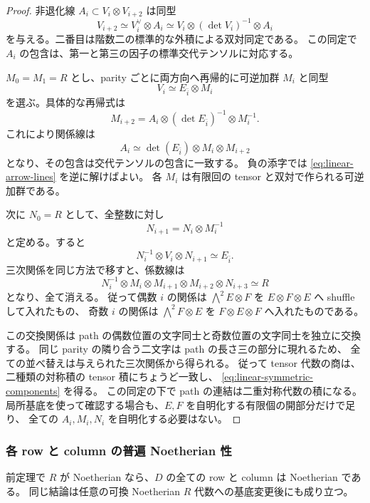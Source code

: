 \begin{proof}
非退化線 $A_i\subset V_i\otimes V_{i+2}$ は同型
\[
 V_{i+2}\simeq V_i^\vee\otimes A_i
 \simeq V_i\otimes(\det V_i)^{-1}\otimes A_i
\]
を与える。二番目は階数二の標準的な外積による双対同定である。
この同定で $A_i$ の包含は、第一と第三の因子の標準交代テンソルに対応する。

$M_0=M_1=R$ とし、parity ごとに両方向へ再帰的に可逆加群 $M_i$ と同型
\[
 V_i\simeq E_{\bar i}\otimes M_i
\]
を選ぶ。具体的な再帰式は
\begin{equation}\label{eq:linear-arrow-lines}
 M_{i+2}=A_i\otimes(\det E_{\bar i})^{-1}\otimes M_i^{-1}.
\end{equation}
これにより関係線は
\[
 A_i\simeq\det(E_{\bar i})\otimes M_i\otimes M_{i+2}
\]
となり、その包含は交代テンソルの包含に一致する。
負の添字では \eqref{eq:linear-arrow-lines} を逆に解けばよい。
各 $M_i$ は有限回の tensor と双対で作られる可逆加群である。

次に $N_0=R$ として、全整数に対し
\begin{equation}\label{eq:linear-vertex-lines}
 N_{i+1}=N_i\otimes M_i^{-1}
\end{equation}
と定める。すると
\[
 N_i^{-1}\otimes V_i\otimes N_{i+1}\simeq E_{\bar i}.
\]
三次関係を同じ方法で移すと、係数線は
\[
 N_i^{-1}\otimes M_i\otimes M_{i+1}\otimes M_{i+2}\otimes N_{i+3}
 \simeq R
\]
となり、全て消える。
従って偶数 $i$ の関係は $\bigwedge^2E\otimes F$ を
$E\otimes F\otimes E$ へ shuffle して入れたもの、
奇数 $i$ の関係は $\bigwedge^2F\otimes E$ を
$F\otimes E\otimes F$ へ入れたものである。

この交換関係は path の偶数位置の文字同士と奇数位置の文字同士を独立に交換する。
同じ parity の隣り合う二文字は path の長さ三の部分に現れるため、
全ての並べ替えは与えられた三次関係から得られる。
従って tensor 代数の商は、二種類の対称積の tensor 積にちょうど一致し、
\eqref{eq:linear-symmetric-components} を得る。
この同定の下で path の連結は二重対称代数の積になる。
局所基底を使って確認する場合も、$E,F$ を自明化する有限個の開部分だけで足り、
全ての $A_i,M_i,N_i$ を自明化する必要はない。
\end{proof}

\subsubsection{各 row と column の普遍 Noetherian 性}

\begin{corollary}\label{cor:linear-universal-row-noetherian}
前定理で $R$ が Noetherian なら、$D$ の全ての row と column は Noetherian である。
同じ結論は任意の可換 Noetherian $R$ 代数への基底変更後にも成り立つ。
\end{corollary}

